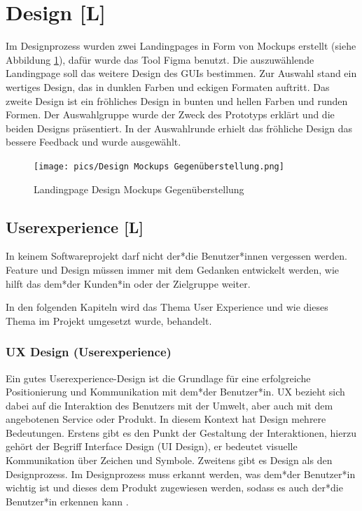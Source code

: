 \section{Design [L]}
Im Designprozess wurden zwei Landingpages in Form von Mockups erstellt (siehe Abbildung \ref{fig:impl:design:mokupsvs}), dafür wurde das Tool Figma benutzt. Die auszuwählende Landingpage soll das weitere Design des GUIs bestimmen.
Zur Auswahl stand ein wertiges Design, das in dunklen Farben und eckigen Formaten auftritt.
Das zweite Design ist ein fröhliches Design in bunten und hellen Farben und runden Formen.
Der Auswahlgruppe wurde der Zweck des Prototyps erklärt und die beiden Designs präsentiert.
In der Auswahlrunde erhielt das fröhliche Design das bessere Feedback und wurde ausgewählt.

\begin{figure}[h t]
    \centering
    \texttt{[image: pics/Design Mockups Gegenüberstellung.png]}
    \caption{Landingpage Design Mockups Gegenüberstellung}
    \label{fig:impl:design:mokupsvs}
\end{figure}


\subsection{Userexperience [L]}
In keinem Softwareprojekt darf nicht der*die Benutzer*innen vergessen werden. Feature und Design müssen immer mit dem Gedanken entwickelt werden, wie hilft das dem*der Kunden*in oder der Zielgruppe weiter.

In den folgenden Kapiteln wird das Thema User Experience und wie dieses Thema im Projekt umgesetzt wurde, behandelt.
\subsubsection{UX Design (Userexperience)}
Ein gutes Userexperience-Design ist die Grundlage für eine erfolgreiche Positionierung und Kommunikation mit dem*der Benutzer*in.
UX bezieht sich dabei auf die Interaktion des Benutzers mit der Umwelt, aber auch mit dem angebotenen Service oder Produkt. In diesem Kontext hat Design mehrere Bedeutungen.
Erstens gibt es den Punkt der Gestaltung der Interaktionen, hierzu gehört der Begriff Interface Design (UI Design), er bedeutet visuelle Kommunikation über Zeichen und Symbole.
Zweitens gibt es Design als den Designprozess. Im Designprozess muss erkannt werden, was dem*der Benutzer*in wichtig ist und dieses dem Produkt zugewiesen werden, sodass es auch der*die Benutzer*in erkennen kann \cite{UserExperienceDesign}.

